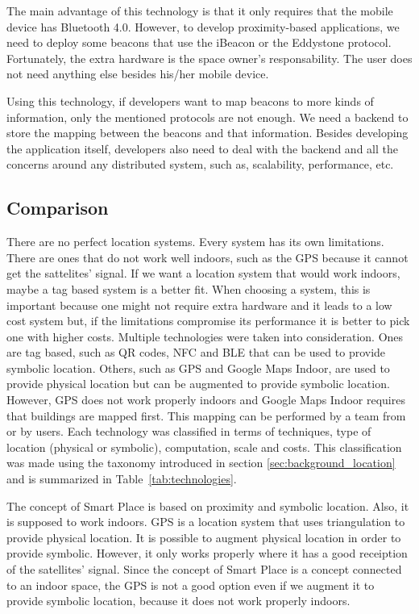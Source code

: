 The main advantage of this technology is that it only requires that the mobile device has Bluetooth 4.0.
However, to develop proximity-based applications, we need to deploy some beacons that use the iBeacon or the Eddystone protocol.
Fortunately, the extra hardware is the space owner's responsability.
The user does not need anything else besides his/her mobile device.

Using this technology, if developers want to map beacons to more kinds of information, only the mentioned protocols are not enough.
We need a backend to store the mapping between the beacons and that information.
Besides developing the application itself, developers also need to deal with the backend and all the concerns around any distributed system, such as, scalability, performance, etc.

\subsection{Comparison}
\label{sub:background_overview}
There are no perfect location systems. Every system has its own limitations.
There are ones that do not work well indoors, such as the \gls{GPS} because it cannot get the sattelites' signal.
If we want a location system that would work indoors, maybe a tag based system is a better fit.
When choosing a system, this is important because one might not require extra hardware and it leads to a low cost system but, if the limitations compromise its performance it is better to pick one with higher costs.
Multiple technologies were taken into consideration.
Ones are tag based, such as \gls{QR} codes, \gls{NFC} and \gls{BLE} that can be used to provide symbolic location.
Others, such as \gls{GPS} and Google Maps Indoor, are used to provide physical location but can be augmented to provide symbolic location.
However, \gls{GPS} does not work properly indoors and Google Maps Indoor requires that buildings are mapped first. This mapping can be performed by a team from  or by users.
Each technology was classified in terms of techniques, type of location (physical or symbolic), computation, scale and costs.
This classification was made using the taxonomy introduced in section \ref{sec:background_location} and is summarized in Table~\ref{tab:technologies}.


The concept of Smart Place is based on proximity and symbolic location.
Also, it is supposed to work indoors.
\gls{GPS} is a location system that uses triangulation to provide physical location.
It is possible to augment physical location in order to provide symbolic.
However, it only works properly where it has a good receiption of the satellites' signal.
Since the concept of Smart Place is a concept connected to an indoor space, the \gls{GPS} is not a good option even if we augment it to provide symbolic location, because it does not work properly indoors.

